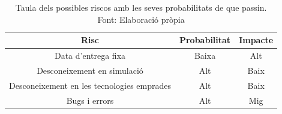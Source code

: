 \documentclass[a4paper]{article}
\begin{document}
\begin{table}[H]
    \centering
        \begin{tabular}{ | c | c | c |}
              \rowcolor{lightgray} \hline \textbf{Risc} & \textbf{Probabilitat} & \textbf{Impacte} \\ \hline
              Data d'entrega fixa & Baixa & Alt \\ \hline
              Desconeixement en simulació & Alt & Baix \\ \hline
              Desconeixement en les tecnologies emprades & Alt & Baix \\ \hline
              Bugs i errors & Alt & Mig \\ \hline
        \end{tabular}
        \caption[Taula dels possibles riscos amb les seves probabilitats de que passin]{Taula dels possibles riscos amb les seves probabilitats de que passin. Font: Elaboració pròpia}
        \label{tab:taulaRiscos}
\end{table}  

\vspace{-0.1 cm}
\end{document}
